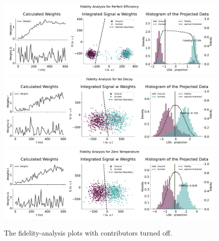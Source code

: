 \begin{figure}[h]
    \centering
    \includegraphics{Simulations/budgets/figures/perfect_efficiency_sme.pdf}
    \includegraphics{Simulations/budgets/figures/no_decay_sme.pdf}
    \includegraphics{Simulations/budgets/figures/zero_temperature_sme.pdf}
    \caption{The fidelity-analysis plots with contributors turned off.}
    \label{fig:enter-label}
\end{figure}

